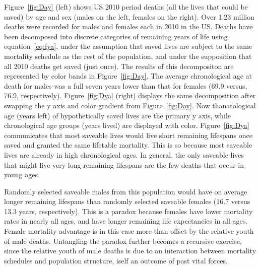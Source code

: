 \documentclass{article}
\begin{document}
Figure~\ref{fig:Day} (left) shows US 2010 period
deaths (all the lives that could be saved) by age and sex (males on the left,
females on the right). Over 1.23 million deaths were recorded for males
and females each in 2010 in the US. Deaths have been decomposed into discrete
categories of remaining years of life using equation~\eqref{eq:fya}, under the assumption that saved lives are subject to the same mortality schedule as the rest of the population, and under the supposition that all 2010 deaths get saved (just once). The results of this decompositon are represented by color bands in
Figure~\ref{fig:Day}. The average chronological age at death
for males was a full seven years lower than that for females
(69.9 versus, 76.9, respectively). Figure~\ref{fig:Dya} (right) displays the
same decomposition after swapping the y axis and color gradient from Figure~\ref{fig:Day}. Now thanatological age (years left) of hypothetically saved lives are the primary y axis, while chronological age groups (years lived) are displayed with color. Figure~\ref{fig:Dya} communicates that most saveable
lives would live short remaining lifespans once saved and granted the same lifetable
mortality. This is so because most saveable lives are already in high
chronological ages. In general, the only saveable lives that might live very
long remaining lifespans are the few deaths that occur in young ages. 

Randomly
selected saveable males from this population would have on average longer
remaining lifespans than randomly selected saveable females (16.7 versus 13.3 years,
respectively). This is a paradox because females have lower mortality rates in
nearly all ages, and have longer remaining life expectancies in all ages. Female
mortality advantage is in this case more than offset by the relative youth of
male deaths. Untangling the paradox further becomes a recursive exercise,
since the relative youth of male deaths is due to an interaction between
mortality schedules and population structure, iself an outcome of past vital forces.
\end{document}
